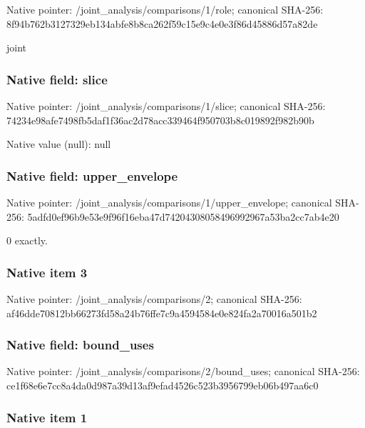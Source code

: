 \documentclass[10pt,a4paper]{article}
\begin{document}
Native pointer: /joint\_analysis/comparisons/1/role; canonical SHA-256: 8f94b762b3127329eb134abf\allowbreak{}e8b8ca262f59c15e9c4e0e3f\allowbreak{}86d45886d57a82de


joint


\subsubsection{Native field: slice}


Native pointer: /joint\_analysis/comparisons/1/slice; canonical SHA-256: 74234e98afe7498fb5daf1f3\allowbreak{}6ac2d78acc339464f950703b\allowbreak{}8c019892f982b90b



Native value (null): null



\subsubsection{Native field: upper\_envelope}


Native pointer: /joint\_analysis/comparis\allowbreak{}ons/1/upper\_envelope; canonical SHA-256: 5adfd0ef96b9e53e9f96f16e\allowbreak{}ba47d7420430805849699296\allowbreak{}7a53ba2cc7ab4e20


0 exactly.


\subsubsection{Native item 3}


Native pointer: /joint\_analysis/comparisons/2; canonical SHA-256: af46dde70812bb66273fd58a\allowbreak{}24b76ffe7c9a4594584e0e82\allowbreak{}4fa2a70016a501b2



\subsubsection{Native field: bound\_uses}


Native pointer: /joint\_analysis/comparis\allowbreak{}ons/2/bound\_uses; canonical SHA-256: ce1f68e6e7cc8a4da0d987a3\allowbreak{}9d13af9efad4526c523b3956\allowbreak{}799eb06b497aa6c0



\subsubsection{Native item 1}
\end{document}
